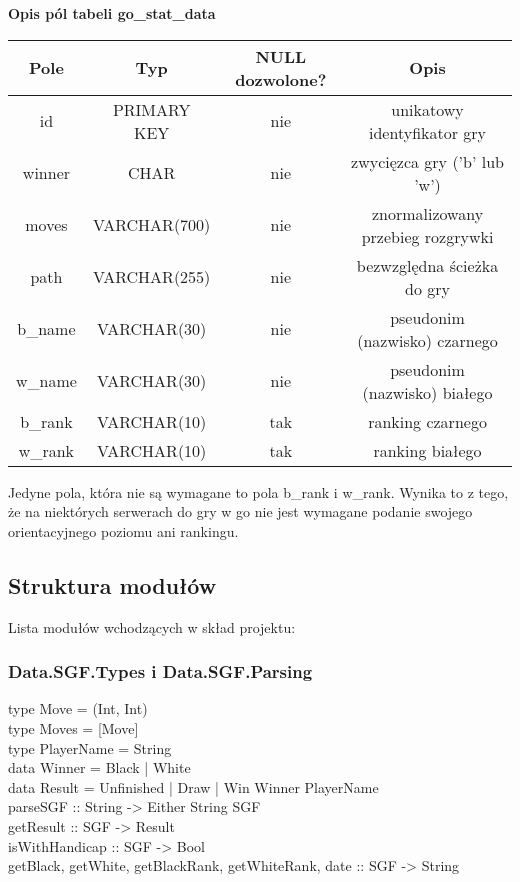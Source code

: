 \documentclass[10pt,leqno]{article}
\begin{document}
\begin{center}
\textbf{Opis pól tabeli go\_stat\_data}
\renewcommand{\arraystretch}{1.5}
\begin{tabular}{| c | c | c | c | } \hline
 Pole    & Typ          & NULL dozwolone? & Opis                  \\ \hline
 id      & PRIMARY KEY  & nie & unikatowy identyfikator gry       \\ \hline
 winner  & CHAR         & nie & zwycięzca gry ('b' lub 'w')       \\ \hline
 moves   & VARCHAR(700) & nie & znormalizowany przebieg rozgrywki \\ \hline
 path    & VARCHAR(255) & nie & bezwzględna ścieżka do gry        \\ \hline
 b\_name & VARCHAR(30)  & nie & pseudonim (nazwisko) czarnego     \\ \hline
 w\_name & VARCHAR(30)  & nie & pseudonim (nazwisko) białego      \\ \hline
 b\_rank & VARCHAR(10)  & tak & ranking czarnego                  \\ \hline
 w\_rank & VARCHAR(10)  & tak & ranking białego                   \\ \hline
\end{tabular}

\end{center}

Jedyne pola, która nie są wymagane to pola b\_rank i w\_rank. Wynika to z tego, że na niektórych serwerach do gry w go
nie jest wymagane podanie swojego orientacyjnego poziomu ani rankingu. 

\subsection{Struktura modułów}
Lista modułów wchodzących w skład projektu:

\subsubsection{Data.SGF.Types i Data.SGF.Parsing}

\begin{framed}
\noindent type Move  = (Int, Int) \\
type Moves = [Move] \\
type PlayerName = String \\ 
data Winner     = Black | White \\
data Result = Unfinished | Draw | Win Winner PlayerName \\

\noindent parseSGF :: String -> Either String SGF \\
getResult :: SGF -> Result \\
isWithHandicap :: SGF -> Bool \\
getBlack, getWhite, getBlackRank, getWhiteRank, date :: SGF -> String
\end{framed}
\end{document}
